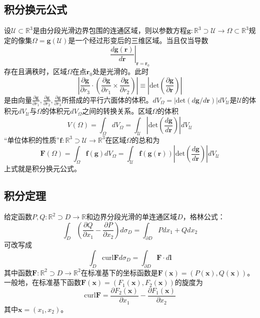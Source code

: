 \documentclass[main.tex]{subfiles}
\begin{document}
\subsection{积分换元公式\cite[p.~116,“五”]{华工高数2009下}}
设$\mathcal{U}\subset\mathbb{R}^3$是由分段光滑边界包围的连通区域，则以参数方程$\mathbf{g}:\mathbb{R}^3\supset \mathcal{U}\rightarrow\Omega\subset\mathbb{R}^3$规定的像集$\Omega=\mathbf{g}\left(\mathcal{U}\right)$是一个经过形变后的三维区域。当且仅当导数
\[
\left.\frac{d\mathbf{g}\left(\mathbf{r}\right)}{d\mathbf{r}}\right|_{\mathbf{r}=\mathbf{r}_0}
\]
存在且满秩时，区域$\Omega$在点$\mathbf{r}_0$处是光滑的。此时
\[
\left|\frac{\partial \mathbf{g}}{\partial r_3}\cdot\left(\frac{\partial\mathbf{g}}{\partial r_1}\times\frac{\partial\mathbf{g}}{\partial r_2}\right)\right|\equiv\left|\mathrm{det}\left(\frac{\partial\mathbf{g}}{\partial\mathbf{r}}\right)\right|
\]
是由向量$\frac{\partial\mathbf{g}}{\partial r_1},\frac{\partial\mathbf{g}}{\partial r_2},\frac{\partial\mathbf{g}}{\partial r_3}$所搭成的平行六面体的体积。$dV_\Omega=\left|\mathrm{det}\left(d\mathbf{g}/d\mathbf{r}\right)\right|dV_\mathcal{U}$是$\mathcal{U}$的体积元$dV_\mathcal{U}$与$\Omega$的体积元$dV_\Omega$之间的转换关系。区域$\Omega$的体积
\[
V\left(\Omega\right)=\int_\Omega dV_\Omega=\int_\mathcal{U}\left|\mathrm{det}\left(\frac{d\mathbf{g}}{d\mathbf{r}}\right)\right|dV_\mathcal{U}
\]
“单位体积的性质”$\mathbf{f}:\mathbb{R}^3\supset\mathcal{U}\rightarrow\mathbb{R}^3$在区域$\Omega$的总和为
\[
\mathbf{F}\left(\Omega\right)=\int_\Omega\mathbf{f}\left(\mathbf{g}\right)dV_\Omega=\int_\mathcal{U}\mathbf{f}\left(\mathbf{g}\left(\mathbf{r}\right)\right)\left|\mathrm{det}\left(\frac{d\mathbf{g}}{d\mathbf{r}}\right)\right|dV_\mathcal{U}
\]
上式就是积分换元公式。

\subsection{积分定理}
给定函数$P,Q:\mathbb{R}^2\supset D\rightarrow\mathbb{R}$和边界分段光滑的单连通区域$D$，格林公式：
\[\int_D\left(\frac{\partial Q}{\partial x_1}-\frac{\partial P}{\partial x_2}\right)d\sigma_D=\int_{\partial D}Pdx_1+Qdx_2
\]
可改写成
\[
\int_D\mathrm{curl}\mathbf{F}d\sigma_D=\int_{\partial D}\mathbf{F}\cdot d\mathbf{l}
\]
其中函数$\mathbf{F}:\mathbb{R}^2\supset D\rightarrow\mathbb{R}^2$在标准基下的坐标函数是$\mathbf{F}\left(\mathbf{x}\right)=\left(P\left(\mathbf{x}\right),Q\left(\mathbf{x}\right)\right)$。一般地，在标准基下函数$\mathbf{F}\left(\mathbf{x}\right)=\left(F_1\left(\mathbf{x}\right),F_2\left(\mathbf{x}\right)\right)$的旋度为
\[\mathrm{curl}\mathbf{F}=\frac{\partial F_2\left(\mathbf{x}\right)}{\partial x_1}-\frac{\partial F_1\left(\mathbf{x}\right)}{\partial x_2}\]
其中$\mathbf{x}=\left(x_1,x_2\right)$。
\end{document}
